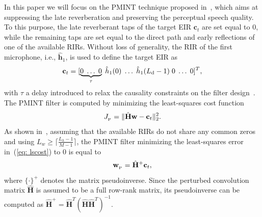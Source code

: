 \documentclass[10pt]{IEEEtran}
\begin{document}
In this paper we will focus on the PMINT technique proposed in~\cite{Kodrasi_ITASLP_2013}, which aims at suppressing the late reverberation and preserving the perceptual speech quality.
{{To this purpose, the late reverberant taps of the target EIR $\mathbf{c}_t$ are set equal to $0$, while the remaining taps are set equal to the direct path and early reflections of one of the available RIRs.
Without loss of generality, the RIR of the first microphone, i.e.,  $\hat{\mathbf{h}}_1$, is used to define the target EIR as
\begin{equation}
\label{eq: ct}
\mathbf{c}_t = [\underbrace{0 \; \ldots \; 0}_{\tau} \; \hat{h}_1(0) \; \ldots \; \hat{h}_1(L_{\rm{d}}-1) \; 0 \; \ldots \; 0 ]^{T},
\end{equation}
with $\tau$ a delay introduced to relax the causality constraints on the filter design~\cite{Hikichi_EURASIP_2007}.}}
The PMINT filter is computed by minimizing the least-squares cost function
\begin{equation}
\label{eq: lscost}
J_{_{\rm P}} = \|\hat{\mathbf{H}}\mathbf{w} - \mathbf{c}_t \|_2^2.
\end{equation}
As shown in~\cite{Miyoshi_ITASS_1988}, assuming that the available RIRs do not share any common zeros and using $L_w \geq \lceil{\frac{L_h-1}{M-1}\rceil}$, the PMINT filter minimizing the least-squares error in~(\ref{eq: lscost}) to 0 is equal to
\begin{equation}
\label{eq: lssol}
\mathbf{w}_{_{\rm P}} = \hat{\mathbf{H}}^+\mathbf{c}_t,
\end{equation}
where $\{\cdot \}^+$ denotes the matrix pseudoinverse.
Since the perturbed convolution matrix $\hat{\mathbf{H}}$ is assumed to be a full row-rank matrix, its pseudoinverse can be computed as $\hat{\mathbf{H}}^+ = \hat{\mathbf{H}}^T(\hat{\mathbf{H}}\hat{\mathbf{H}}^T)^{-1}$.
\end{document}
